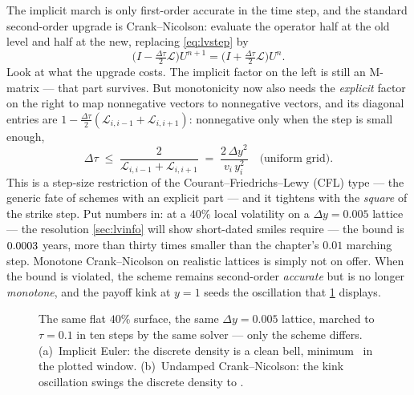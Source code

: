 The implicit march is only first-order accurate in the time step, and
the standard second-order upgrade is Crank--Nicolson: evaluate the
operator half at the old level and half at the new, replacing
\eqref{eq:lvstep} by
\[
\big(I-\tfrac{\Delta\tau}{2}\mathcal L\big)U^{n+1}
=\big(I+\tfrac{\Delta\tau}{2}\mathcal L\big)U^{n}.
\]
Look at what the upgrade costs.  The implicit factor on the left is
still an M-matrix --- that part survives.  But monotonicity now also
needs the \emph{explicit} factor on the right to map nonnegative
vectors to nonnegative vectors, and its diagonal entries are
$1-\tfrac{\Delta\tau}{2}(\mathcal L_{i,i-1}+\mathcal L_{i,i+1})$:
nonnegative only when the step is small enough,
\begin{equation}
\Delta\tau\;\le\;\frac{2}{\mathcal L_{i,i-1}+\mathcal L_{i,i+1}}
\;=\;\frac{2\,\Delta y^{2}}{v_i\,y_i^{2}}
\quad\text{(uniform grid)}.
\label{eq:lvcfl}
\end{equation}
This is a step-size restriction of the Courant--Friedrichs--Lewy (CFL)
type --- the generic fate of schemes with an explicit part --- and it
tightens with the \emph{square} of
the strike step.  Put numbers in: at a $40\%$ local volatility on a
$\Delta y=0.005$ lattice --- the resolution \cref{sec:lvinfo} will
show short-dated smiles require --- the bound is
$0.0003$ years, more than thirty times smaller than the
chapter's $0.01$ marching step.  Monotone Crank--Nicolson on realistic
lattices is simply not on offer.  When the bound is violated, the
scheme remains second-order \emph{accurate} but is no longer
\emph{monotone}, and the payoff kink at $y=1$ seeds the oscillation
that \cref{fig:lvmonotone} displays.

\begin{figure}[htbp]
\centering
{}
\caption{The same flat $40\%$ surface, the same $\Delta y=0.005$
lattice, marched to $\tau=0.1$ in ten steps by the same solver ---
only the scheme differs.  (a)~Implicit Euler: the discrete density is
a clean bell, minimum \MacLvLatImplMinDens\ in the plotted window.
(b)~Undamped Crank--Nicolson: the kink oscillation swings the discrete
density to \MacLvLatCnMinDens.}
\label{fig:lvmonotone}
\end{figure}

